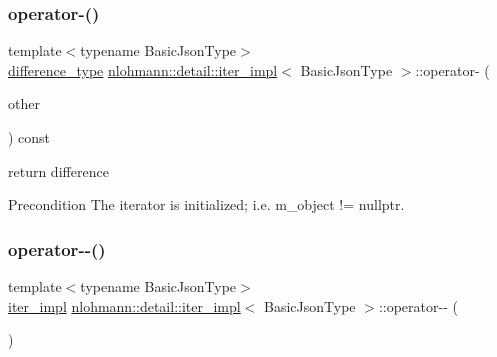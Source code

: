\subsubsection{\texorpdfstring{operator-\/()}{operator-()}\hspace{0.1cm}{\footnotesize\ttfamily [2/2]}}
{\footnotesize\ttfamily template$<$typename Basic\+Json\+Type$>$ \\
\hyperlink{classnlohmann_1_1detail_1_1iter__impl_a2f7ea9f7022850809c60fc3263775840}{difference\+\_\+type} \hyperlink{classnlohmann_1_1detail_1_1iter__impl}{nlohmann\+::detail\+::iter\+\_\+impl}$<$ Basic\+Json\+Type $>$\+::operator-\/ (\begin{DoxyParamCaption}\item[{const \hyperlink{classnlohmann_1_1detail_1_1iter__impl}{iter\+\_\+impl}$<$ Basic\+Json\+Type $>$ \&}]{other }\end{DoxyParamCaption}) const\hspace{0.3cm}{\ttfamily [inline]}}



return difference 

\begin{DoxyPrecond}{Precondition}
The iterator is initialized; i.\+e. {\ttfamily m\+\_\+object != nullptr}. 
\end{DoxyPrecond}
\mbox{\label{classnlohmann_1_1detail_1_1iter__impl_ab8479a4395bb0ab3661d842a9ee47767}} 
\subsubsection{\texorpdfstring{operator-\/-\/()}{operator--()}\hspace{0.1cm}{\footnotesize\ttfamily [1/2]}}
{\footnotesize\ttfamily template$<$typename Basic\+Json\+Type$>$ \\
\hyperlink{classnlohmann_1_1detail_1_1iter__impl}{iter\+\_\+impl} \hyperlink{classnlohmann_1_1detail_1_1iter__impl}{nlohmann\+::detail\+::iter\+\_\+impl}$<$ Basic\+Json\+Type $>$\+::operator-\/-\/ (\begin{DoxyParamCaption}\item[{int}]{ }\end{DoxyParamCaption})\hspace{0.3cm}{\ttfamily [inline]}}




